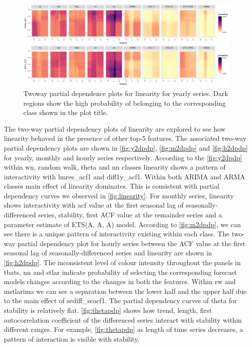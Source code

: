 \documentclass[11pt,a4paper,]{article}
\begin{document}
\begin{figure}[h]

{\centering \includegraphics[width=\textwidth]{figure/y2dpdp-1} 

}

\caption{Two\-way partial dependence plots for linearity for yearly series. Dark regions show the high probability of belonging to the corresponding class shown in the plot title.}\label{fig:y2dpdp}
\end{figure}

The two-way partial dependency plots of linearity are explored to see how linearity behaved in the presence of other top-5 features. The associated two-way partial dependency plots are shown in \autoref{fig:y2dpdp}, \autoref{fig:m2dpdp} and \autoref{fig:h2dpdp} for yearly, monthly and hourly series respectively. According to the \autoref{fig:y2dpdp} within wn, random walk, theta and nn classes linearity shows a pattern of interactivity with lmres\_acf1 and diff1y\_acf1. Within both ARIMA and ARMA classes main effect of linearity dominates. This is consistent with partial dependency curves we observed in \autoref{fig:linearity}. For monthly series, linearity shows interactivity with acf value at the first seasonal lag of seasonally-differenced series, stability, first ACF value at the remainder series and a parameter estimate of ETS(A, A, A) model. According to \autoref{fig:m2dpdp}, we can see there is a unique pattern of interactivity existing within each class. The two-way partial dependency plot for hourly series between the ACF value at the first seasonal lag of seasonally-differenced series and linearity are shown in \autoref{fig:h2dpdp}. The inconsistent level of colour intensity throughout the panels in tbats, nn and stlar indicate probability of selecting the corresponding forecast models changes according to the changes in both the features. Within rw and mstlarima we can see a separation between the lower half and the upper half due to the main effect of sediff\_seacf1. The partial dependency curves of theta for stability is relatively flat. \autoref{fig:thetapdp} shows how trend, length, first autocorrelation coefficient of the differenced series interact with stability within different ranges. For example, \autoref{fig:thetapdp} as length of time series decreases, a pattern of interaction is visible with stability.
\end{document}
